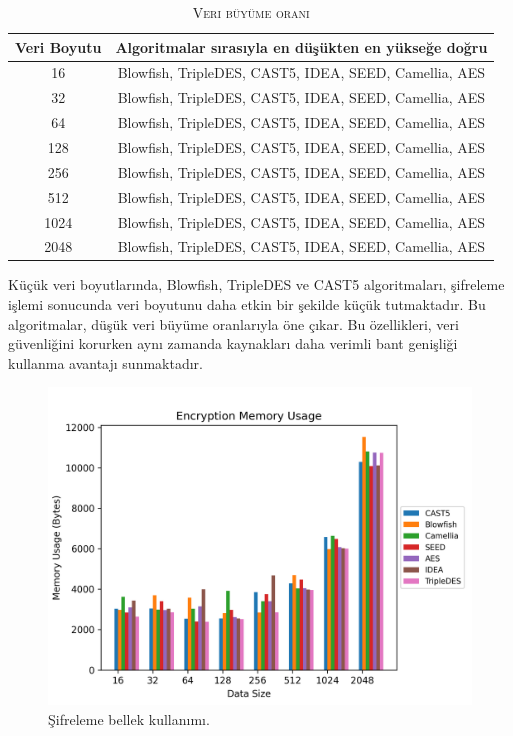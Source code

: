 \documentclass[conference, a4paper]{IEEEtran}
\begin{document}
    \begin{table}[h]
        \centering
        \caption{\textsc{Veri büyüme oranı}}
        \label{tablo1}
        \begin{tabular}{|c|c|}
            \hline
                Veri Boyutu & Algoritmalar sırasıyla en düşükten en yükseğe doğru \\
            \hline
            16 & Blowfish, TripleDES, CAST5, IDEA, SEED, Camellia, AES \\
            \hline
            32 & Blowfish, TripleDES, CAST5, IDEA, SEED, Camellia, AES \\
            \hline
            64 & Blowfish, TripleDES, CAST5, IDEA, SEED, Camellia, AES \\
            \hline
            128 & Blowfish, TripleDES, CAST5, IDEA, SEED, Camellia, AES \\
            \hline
            256 & Blowfish, TripleDES, CAST5, IDEA, SEED, Camellia, AES \\
            \hline
            512 & Blowfish, TripleDES, CAST5, IDEA, SEED, Camellia, AES \\
            \hline
            1024 & Blowfish, TripleDES, CAST5, IDEA, SEED, Camellia, AES \\
            \hline
            2048 & Blowfish, TripleDES, CAST5, IDEA, SEED, Camellia, AES \\
            \hline
        \end{tabular}
    \end{table}

    Küçük veri boyutlarında, Blowfish, TripleDES ve CAST5 algoritmaları, şifreleme işlemi sonucunda veri boyutunu daha etkin bir şekilde küçük tutmaktadır. Bu algoritmalar, düşük veri büyüme oranlarıyla öne çıkar. Bu özellikleri, veri güvenliğini korurken aynı zamanda kaynakları daha verimli bant genişliği kullanma avantajı sunmaktadır.

    \begin{figure}[H]
    \centering
    \shorthandoff{=}  
    \includegraphics[scale=0.52]{fig5.png}
    \shorthandon{=} 
    \caption{Şifreleme bellek kullanımı.}
    \label{sekil5}
    \end{figure}
\end{document}
